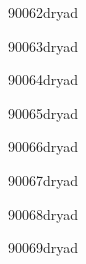 \documentclass[
12pt,
a4paper,
final,
notitlepage,
oneside,
openany,
]{report}
\begin{document}





{90062dryad}

{90063dryad}

{90064dryad}

{90065dryad}

{90066dryad}

{90067dryad}

{90068dryad}

{90069dryad}
\end{document}

